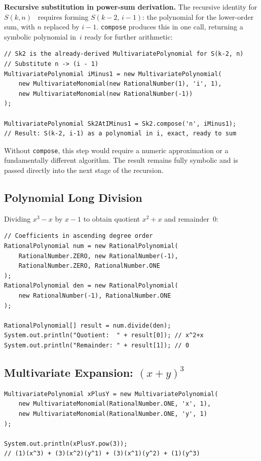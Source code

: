 \documentclass[11pt,a4paper]{article}
\begin{document}
\textbf{Recursive substitution in power-sum derivation.}
The recursive identity for $S(k,n)$~\cite{trinsit2026} requires forming
$S(k{-}2,\,i{-}1)$: the polynomial for the lower-order sum, with $n$ replaced
by $i-1$.
\texttt{compose} produces this in one call, returning a symbolic polynomial
in~$i$ ready for further arithmetic:

\begin{lstlisting}
// Sk2 is the already-derived MultivariatePolynomial for S(k-2, n)
// Substitute n -> (i - 1)
MultivariatePolynomial iMinus1 = new MultivariatePolynomial(
    new MultivariateMonomial(new RationalNumber(1), 'i', 1),
    new MultivariateMonomial(new RationalNumber(-1))
);

MultivariatePolynomial Sk2AtIMinus1 = Sk2.compose('n', iMinus1);
// Result: S(k-2, i-1) as a polynomial in i, exact, ready to sum
\end{lstlisting}

Without \texttt{compose}, this step would require a numeric approximation or
a fundamentally different algorithm.
The result remains fully symbolic and is passed directly into the next
stage of the recursion.

\subsection{Polynomial Long Division}

Dividing $x^{3}-x$ by $x-1$ to obtain quotient $x^{2}+x$ and remainder~$0$:

\begin{lstlisting}
// Coefficients in ascending degree order
RationalPolynomial num = new RationalPolynomial(
    RationalNumber.ZERO, new RationalNumber(-1),
    RationalNumber.ZERO, RationalNumber.ONE
);
RationalPolynomial den = new RationalPolynomial(
    new RationalNumber(-1), RationalNumber.ONE
);

RationalPolynomial[] result = num.divide(den);
System.out.println("Quotient:  " + result[0]); // x^2+x
System.out.println("Remainder: " + result[1]); // 0
\end{lstlisting}

\subsection{Multivariate Expansion: $(x+y)^{3}$}

\begin{lstlisting}
MultivariatePolynomial xPlusY = new MultivariatePolynomial(
    new MultivariateMonomial(RationalNumber.ONE, 'x', 1),
    new MultivariateMonomial(RationalNumber.ONE, 'y', 1)
);

System.out.println(xPlusY.pow(3));
// (1)(x^3) + (3)(x^2)(y^1) + (3)(x^1)(y^2) + (1)(y^3)
\end{lstlisting}
\end{document}

